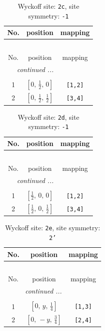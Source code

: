 \documentclass[fleqn,8pt]{jsarticle}
\begin{document}
\begin{longtable}{ccc}
\caption{Wyckoff site: {\tt 2c}, site symmetry: {\tt -1}}
 \\
 \hline \hline
No. & position & mapping \\ \hline \endfirsthead

\multicolumn{2}{l}{\tablename\ \thetable{}} \\
 \hline \hline
No. & position & mapping \\ \hline \endhead

 \hline \hline
\multicolumn{2}{r}{\footnotesize\it continued ...} \\ \endfoot

 \hline \hline
\multicolumn{2}{r}{} \\ \endlastfoot

1 & $\left[ 0,\, \frac{1}{2},\, 0 \right]$ & {\tt [1,2]} \\ \hline
2 & $\left[ 0,\, \frac{1}{2},\, \frac{1}{2} \right]$ & {\tt [3,4]} \\
\end{longtable}
\renewcommand{\arraystretch}{1.2}
\begin{longtable}{ccc}
\caption{Wyckoff site: {\tt 2d}, site symmetry: {\tt -1}}
 \\
 \hline \hline
No. & position & mapping \\ \hline \endfirsthead

\multicolumn{2}{l}{\tablename\ \thetable{}} \\
 \hline \hline
No. & position & mapping \\ \hline \endhead

 \hline \hline
\multicolumn{2}{r}{\footnotesize\it continued ...} \\ \endfoot

 \hline \hline
\multicolumn{2}{r}{} \\ \endlastfoot

1 & $\left[ \frac{1}{2},\, 0,\, 0 \right]$ & {\tt [1,2]} \\ \hline
2 & $\left[ \frac{1}{2},\, 0,\, \frac{1}{2} \right]$ & {\tt [3,4]} \\
\end{longtable}
\renewcommand{\arraystretch}{1.2}
\begin{longtable}{ccc}
\caption{Wyckoff site: {\tt 2e}, site symmetry: {\tt 2'}}
 \\
 \hline \hline
No. & position & mapping \\ \hline \endfirsthead

\multicolumn{2}{l}{\tablename\ \thetable{}} \\
 \hline \hline
No. & position & mapping \\ \hline \endhead

 \hline \hline
\multicolumn{2}{r}{\footnotesize\it continued ...} \\ \endfoot

 \hline \hline
\multicolumn{2}{r}{} \\ \endlastfoot

1 & $\left[ 0,\, y,\, \frac{1}{4} \right]$ & {\tt [1,3]} \\ \hline
2 & $\left[ 0,\, - y,\, \frac{3}{4} \right]$ & {\tt [2,4]} \\
\end{longtable}
\end{document}
